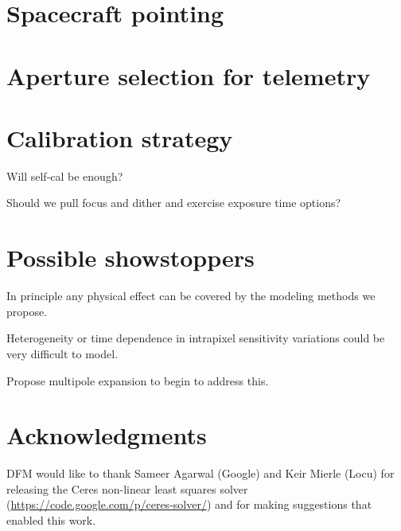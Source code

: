 \documentclass[letterpaper,12pt,preprint]{aastex}
\begin{document}
\section{Spacecraft pointing}\label{sec:pointing}

\section{Aperture selection for telemetry}\label{sec:telemetry}

\section{Calibration strategy}\label{sec:calibration}

Will self-cal be enough?

Should we pull focus and dither and exercise exposure time options?

\section{Possible showstoppers}\label{sec:stop}

In principle any physical effect can be covered by the modeling
methods we propose.

Heterogeneity or time dependence in intrapixel sensitivity variations
could be very difficult to model.

Propose multipole expansion to begin to address this.

\section{Acknowledgments}

DFM would like to thank Sameer Agarwal (Google) and Keir Mierle (Locu) for
releasing the Ceres non-linear least squares solver
(\url{https://code.google.com/p/ceres-solver/}) and for making suggestions
that enabled this work.
\end{document}
